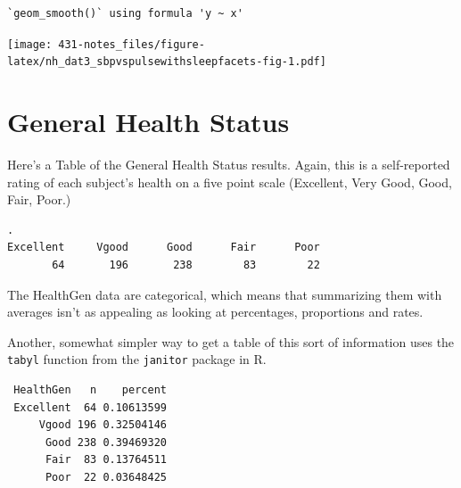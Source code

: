\documentclass[
]{book}
\newenvironment{Shaded}{\begin{snugshade}}{\end{snugshade}}
\newcommand{\CommentTok}[1]{\textcolor[rgb]{0.56,0.35,0.01}{\textit{#1}}}
\newcommand{\KeywordTok}[1]{\textcolor[rgb]{0.13,0.29,0.53}{\textbf{#1}}}
\newcommand{\NormalTok}[1]{#1}
\newcommand{\OperatorTok}[1]{\textcolor[rgb]{0.81,0.36,0.00}{\textbf{#1}}}
\newcommand{\StringTok}[1]{\textcolor[rgb]{0.31,0.60,0.02}{#1}}
\begin{document}
\begin{verbatim}
`geom_smooth()` using formula 'y ~ x'
\end{verbatim}

\texttt{[image: 431-notes\_files/figure-latex/nh\_dat3\_sbpvspulsewithsleepfacets-fig-1.pdf]}

\hypertarget{general-health-status}{%
\section{General Health Status}\label{general-health-status}}

Here's a Table of the General Health Status results. Again, this is a self-reported rating of each subject's health on a five point scale (Excellent, Very Good, Good, Fair, Poor.)

\begin{Shaded}
\end{Shaded}

\begin{verbatim}
.
Excellent     Vgood      Good      Fair      Poor 
       64       196       238        83        22 
\end{verbatim}

The HealthGen data are categorical, which means that summarizing them with averages isn't as appealing as looking at percentages, proportions and rates.

Another, somewhat simpler way to get a table of this sort of information uses the \texttt{tabyl} function from the \texttt{janitor} package in R.

\begin{Shaded}
\end{Shaded}

\begin{verbatim}
 HealthGen   n    percent
 Excellent  64 0.10613599
     Vgood 196 0.32504146
      Good 238 0.39469320
      Fair  83 0.13764511
      Poor  22 0.03648425
\end{verbatim}
\end{document}
